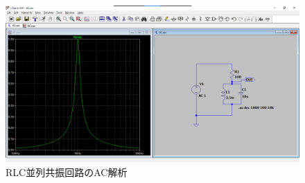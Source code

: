 \begin{description}
  \begin{figure}[htbp]
    \begin{center}
    \includegraphics[width=\linewidth]{img/10_1.png}
    \caption{RLC並列共振回路のAC解析}
    \label{shuhasu}
    \end{center}
  \end{figure}
\end{description}